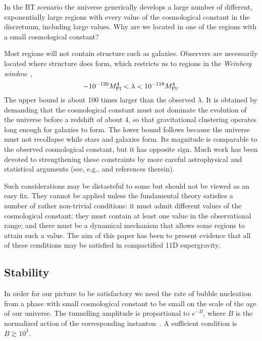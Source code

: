 \documentclass[12pt]{article}
\begin{document}
In the BT scenario the universe generically develops a large number of
different, exponentially large regions with every value of the
cosmological constant in the discretuum, including large values.  Why
are we located in one of the regions with a small cosmological
constant?

Most regions will not contain structure such as galaxies.  Observers
are necessarily located where structure does form, which restricts us
to regions in the {\em Weinberg window\/}~\cite{Wei87},
\begin{equation}
-10^{-120} M_{\rm Pl}^4 < \lambda < 10^{-118} M_{\rm Pl}^4.
\label{eq-weinberg}
\end{equation}
The upper bound is about 100 times larger than the observed $\lambda$.
It is obtained by demanding that the cosmological constant must not
dominate the evolution of the universe before a redshift of about 4,
so that gravitational clustering operates long enough for galaxies to
form.  The lower bound follows because the universe must not
recollapse while stars and galaxies form.  Its magnitude is comparable
to the observed cosmological constant, but it has opposite sign.  Much
work has been devoted to strengthening these constraints by more
careful astrophysical and statistical arguments (see, e.g.,
\cite{Efs95,Wei96,MarSha97,GarVil99} and references therein).

Such considerations may be distasteful to some but should not be
viewed as an easy fix.  They cannot be applied unless the fundamental
theory satisfies a number of rather non-trivial conditions: it must
admit different values of the cosmological constant; they must contain
at least one value in the observational range; and there must be a
dynamical mechanism that allows some regions to attain such a value.
The aim of this paper has been to present evidence that all of these
conditions may be satisfied in compactified 11D supergravity.



\subsection{Stability}

In order for our picture to be satisfactory we need the rate of bubble
nucleation from a phase with small cosmological constant to be small
on the scale of the age of our universe.  The tunnelling amplitude is
proportional to $e^{-B}$, where $B$ is the normalized action of the
corresponding instanton~\cite{BroTei87,BroTei88}.  A sufficient
condition is $B \gtrsim 10^3$.
\end{document}

